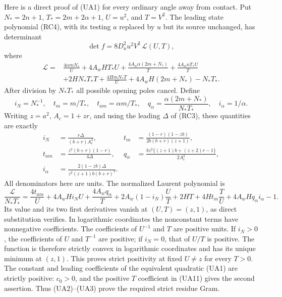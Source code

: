 Here is a direct proof of (UA1) for every ordinary angle away from
contact. Put $N_*=2n+1$, $T_*=2m+2\alpha+1$, $U=u^2$, and
$T=V^2$. The leading state polynomial (RC4), with its testing $a$
replaced by $u$ but its source unchanged, has determinant
\[
 \det f=8D_u^2u^2V^2\,\mathcal L(U,T),                \tag{UA9}
\]
where
\begin{align*}
\mathcal L={}&\frac{4\alpha mN_*}{U}
 +4A_wHT_*U+\frac{4A_w\alpha(2m+N_*)}{T}
 +\frac{4A_wnT_*U}{T}\\
 &+2HN_*T_*T+\frac{4HmN_*T}{U}
 +4A_wH(2m+N_*)-N_*T_*.
\end{align*}
After division by $N_*T_*$ all possible opening poles cancel. Define
\[
 i_N=N_*^{-1},\quad t_m=m/T_*,\quad t_{am}=\alpha m/T_*,
 \quad q_\alpha=\frac{\alpha(2m+N_*)}{N_*T_*},\quad i_\alpha=1/\alpha.
\]
Writing $z=a^2$, $A_c=1+zr$, and using the leading $\Delta$ of (RC3),
these quantities are exactly
\[
\begin{aligned}
 i_N&=\frac{r\Delta}{(b+r)A_c^2},&
 t_m&=\frac{(1-r)(1-zb)}{2b(b+r)(z+1)},\\
 t_{am}&=\frac{z^2(b+r)(1-r)}{4\Delta},&
 q_\alpha&=\frac{bz^2\{(z+1)b+(z+2)r-1\}}{2A_c^2},\\
 i_\alpha&=\frac{2(1-zb)\Delta}{z^2(z+1)b(b+r)^2}.
\end{aligned}\tag{UA10}
\]
All denominators here are units. The normalized Laurent polynomial is
\[
 \frac{\mathcal L}{N_*T_*}
 =\frac{4t_{am}}U+4A_wHi_NU+\frac{4A_wq_\alpha}T
  +2A_w(1-i_N)\frac UT+2HT+4Ht_m\frac TU
  +4A_wHq_\alpha i_\alpha-1.                         \tag{UA11}
\]
Its value and its two first derivatives vanish at $(U,T)=(z,1)$,
as direct substitution verifies. In logarithmic coordinates the
nonconstant terms have nonnegative coefficients. The coefficients of
$U^{-1}$ and $T$ are positive units. If $i_N>0$, the coefficients of
$U$ and $T^{-1}$ are positive; if $i_N=0$, that of $U/T$ is positive.
The function is therefore strictly convex in logarithmic coordinates
and has its unique minimum at $(z,1)$. This proves strict positivity
at fixed $U\ne z$ for every $T>0$. The constant and leading
coefficients of the equivalent quadratic (UA1) are strictly positive:
$c_0>0$, and the positive $T$ coefficient in (UA11) gives the second
assertion. Thus (UA2)--(UA3) prove the required strict residue Gram.

